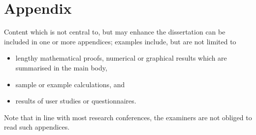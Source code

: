 \documentclass[ %
                    author={Louis Wang},
                supervisor={Dr. Qiang Liu},
                    degree={MSc},
                     title={Identification of Suicide Ideation in Texts},
                      type={},
                      year={2024}]{dissertation}
\begin{document}

\appendix

\chapter{Appendix}
\label{appx:example}

Content which is not central to, but may enhance the dissertation can be 
included in one or more appendices; examples include, but are not limited
to

\begin{itemize}
\item lengthy mathematical proofs, numerical or graphical results which 
      are summarised in the main body,
\item sample or example calculations, 
      and
\item results of user studies or questionnaires.
\end{itemize}

\noindent
Note that in line with most research conferences, the examiners are not
obliged to read such appendices.

\end{document}
